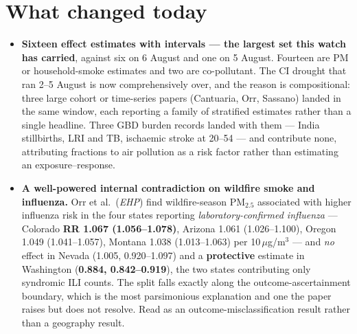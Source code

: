 \documentclass[10pt]{article}
\begin{document}
\enlargethispage{3\baselineskip}
\section*{\sffamily\bfseries\color{Deep}What changed today}
\vspace{-1.5mm}{\color{Amber}\rule{\linewidth}{1.1pt}}\vspace{2.5mm}

\footnotesize
\begin{itemize}
\item \textbf{Sixteen effect estimates with intervals --- the largest set this watch has
carried}, against six on 6 August and one on 5 August. Fourteen are PM or household-smoke
estimates and two are co-pollutant. The CI drought that ran 2--5 August is now
comprehensively over, and the reason is compositional: three large cohort or time-series
papers (Cantuaria, Orr, Sassano) landed in the same window, each reporting a family of
stratified estimates rather than a single headline. Three GBD burden records landed with
them --- India stillbirths, LRI and TB, ischaemic stroke at 20--54 --- and contribute none,
attributing fractions to air pollution as a risk factor rather than estimating an
exposure--response.

\item \textbf{A well-powered internal contradiction on wildfire smoke and influenza.}
Orr et al.\ (\textit{EHP}) find wildfire-season PM$_{2.5}$ associated with higher
influenza risk in the four states reporting \emph{laboratory-confirmed influenza} ---
Colorado \textbf{RR 1.067 (1.056--1.078)}, Arizona 1.061 (1.026--1.100), Oregon 1.049
(1.041--1.057), Montana 1.038 (1.013--1.063) per 10\,$\mu$g/m$^3$ --- and \emph{no} effect
in Nevada (1.005, 0.920--1.097) and a \textbf{protective} estimate in Washington
(\textbf{0.884, 0.842--0.919}), the two states contributing only syndromic ILI counts.
The split falls exactly along the outcome-ascertainment boundary, which is the most
parsimonious explanation and one the paper raises but does not resolve. Read as an
outcome-misclassification result rather than a geography result.


\end{itemize}
\end{document}
